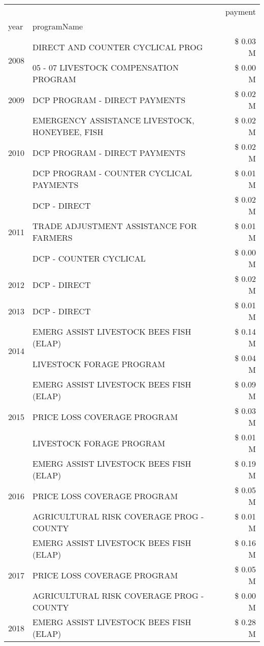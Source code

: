 \begin{tabular}{llr}
\toprule
 &  & payment \\
year & programName &  \\
\midrule
\multirow[t]{2}{*}{2008} & DIRECT AND COUNTER CYCLICAL PROG & \$ 0.03 M \\
 & 05 - 07 LIVESTOCK COMPENSATION PROGRAM & \$ 0.00 M \\
\cline{1-3}
2009 & DCP PROGRAM - DIRECT PAYMENTS & \$ 0.02 M \\
\cline{1-3}
\multirow[t]{3}{*}{2010} & EMERGENCY ASSISTANCE LIVESTOCK, HONEYBEE, FISH & \$ 0.02 M \\
 & DCP PROGRAM - DIRECT PAYMENTS & \$ 0.02 M \\
 & DCP PROGRAM - COUNTER CYCLICAL PAYMENTS & \$ 0.01 M \\
\cline{1-3}
\multirow[t]{3}{*}{2011} & DCP - DIRECT & \$ 0.02 M \\
 & TRADE ADJUSTMENT ASSISTANCE FOR FARMERS & \$ 0.01 M \\
 & DCP - COUNTER CYCLICAL & \$ 0.00 M \\
\cline{1-3}
2012 & DCP - DIRECT & \$ 0.02 M \\
\cline{1-3}
2013 & DCP - DIRECT & \$ 0.01 M \\
\cline{1-3}
\multirow[t]{2}{*}{2014} & EMERG ASSIST LIVESTOCK BEES FISH (ELAP) & \$ 0.14 M \\
 & LIVESTOCK FORAGE PROGRAM & \$ 0.04 M \\
\cline{1-3}
\multirow[t]{3}{*}{2015} & EMERG ASSIST LIVESTOCK BEES FISH (ELAP) & \$ 0.09 M \\
 & PRICE LOSS COVERAGE PROGRAM & \$ 0.03 M \\
 & LIVESTOCK FORAGE PROGRAM & \$ 0.01 M \\
\cline{1-3}
\multirow[t]{3}{*}{2016} & EMERG ASSIST LIVESTOCK BEES FISH (ELAP)       & \$ 0.19 M \\
 & PRICE LOSS COVERAGE PROGRAM                   & \$ 0.05 M \\
 & AGRICULTURAL RISK COVERAGE PROG - COUNTY      & \$ 0.01 M \\
\cline{1-3}
\multirow[t]{3}{*}{2017} & EMERG ASSIST LIVESTOCK BEES FISH (ELAP) & \$ 0.16 M \\
 & PRICE LOSS COVERAGE PROGRAM & \$ 0.05 M \\
 & AGRICULTURAL RISK COVERAGE PROG - COUNTY & \$ 0.00 M \\
\cline{1-3}
\multirow[t]{3}{*}{2018} & EMERG ASSIST LIVESTOCK BEES FISH (ELAP) & \$ 0.28 M \\

\end{tabular}

